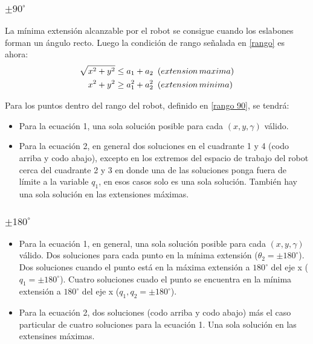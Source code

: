 \documentclass[a4paper,12pt]{article}
\begin{document}
\subsubsection{$\pm 90^\circ$}
La mínima extensión alcanzable por el robot se consigue cuando los eslabones forman un ángulo recto. Luego la condición de rango señalada en \cref{rango} es ahora:
\begin{equation}
    \begin{aligned}
        \sqrt{x^2 + y^2}&\leq  a_1 + a_2\,\,\, \text(extension\,maxima)\\
        x^2 + y^2& \geq a_1^2 + a_2^2\,\,\, \text(extension\,minima)
    \end{aligned}
    \label{rango 90}
\end{equation}

Para los puntos dentro del rango del robot, definido en \cref{rango 90}, se tendrá:
\begin{itemize}
    \item Para la ecuación 1, una sola solución posible para cada $\left(x, y, \gamma\right)$ válido.
    \item Para la ecuación 2, en general dos soluciones en el cuadrante 1 y 4 (codo arriba y codo abajo), excepto en los extremos del espacio de trabajo del robot cerca del cuadrante 2 y 3 en donde una de las soluciones ponga fuera de límite a la variable $q_1$, en esos casos solo es una sola solución. También hay una sola solución en las extensiones máximas.
\end{itemize}

\subsubsection{$\pm 180^\circ$}

\begin{itemize}
    \item Para la ecuación 1, en general, una sola solución posible para cada $\left(x, y, \gamma\right)$ válido. Dos soluciones para cada punto en la mínima extensión ($\theta_2 = \pm 180^\circ$). Dos soluciones cuando el punto está en la máxima extensión a $180^\circ$ del eje x ($q_1 = \pm 180^\circ$). Cuatro soluciones cuado el punto se encuentra en la mínima extensión a $180^\circ$ del eje x ($q_1, q_2 = \pm 180^\circ$).
    \item Para la ecuación 2, dos soluciones (codo arriba y codo abajo) más el caso particular de cuatro soluciones para la ecuación 1. Una sola solución en las extensines máximas.
\end{itemize}
\end{document}

